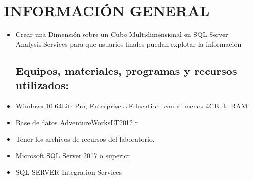 \section{INFORMACIÓN GENERAL} 

\begin{itemize}
\subsection{Objetivos:}
	\item Crear una Dimensión sobre un Cubo Multidimensional en SQL Server Analysis Services para que usuarios finales puedan explotar la información

\subsection{Equipos, materiales, programas y recursos utilizados:}
	\item Windows 10 64bit: Pro, Enterprise o Education, con al menos 4GB de RAM.
	\item Base de datos AdventureWorksLT2012 r
	\item Tener los archivos de recursos del laboratorio.
	\item Microsoft SQL Server 2017 o superior
	\item SQL SERVER Integration Services

\end{itemize}
